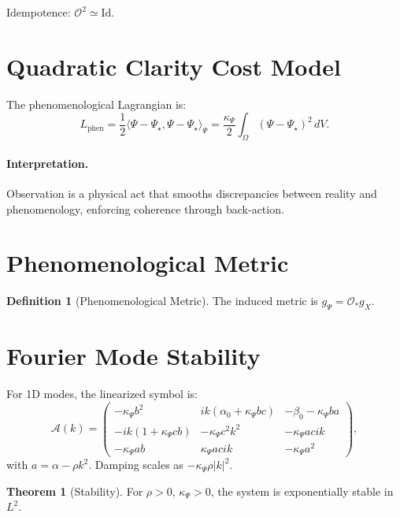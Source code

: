\documentclass[12pt]{book}
\theoremstyle{definition}
\newtheorem{definition}{Definition}[chapter]
\newtheorem{theorem}{Theorem}[chapter]
\begin{document}
Idempotence: \(\mathcal{O}^2 \simeq \text{Id}\).

\section{Quadratic Clarity Cost Model}
The phenomenological Lagrangian is:
\begin{equation}
L_{\text{phen}} = \frac{1}{2} \langle \Psi - \Psi_\star, \Psi - \Psi_\star \rangle_\Psi = \frac{\kappa_\Psi}{2} \int_\Omega (\Psi - \Psi_\star)^2 \, dV.
\end{equation}

\paragraph{Interpretation.} Observation is a physical act that smooths discrepancies between reality and phenomenology, enforcing coherence through back-action.

\section{Phenomenological Metric}
\begin{definition}[Phenomenological Metric]
\label{def:pheno_metric}
The induced metric is \(g_\Psi = \mathcal{O}_* g_X\).
\end{definition}

\section{Fourier Mode Stability}
For 1D modes, the linearized symbol is:
\begin{equation}
\mathcal{A}(k) =
\begin{pmatrix}
-\kappa_\Psi b^2 & i k(\alpha_0 + \kappa_\Psi b c) & -\beta_0 - \kappa_\Psi b a \\
- i k(1 + \kappa_\Psi c b) & -\kappa_\Psi c^2 k^2 & - \kappa_\Psi a c i k \\
-\kappa_\Psi a b & \kappa_\Psi a c i k & -\kappa_\Psi a^2
\end{pmatrix},
\end{equation}
with \(a = \alpha - \rho k^2\). Damping scales as \(-\kappa_\Psi \rho |k|^2\).

\begin{theorem}[Stability]
\label{thm:stability}
For \(\rho > 0\), \(\kappa_\Psi > 0\), the system is exponentially stable in \(L^2\).
\end{theorem}
\end{document}
